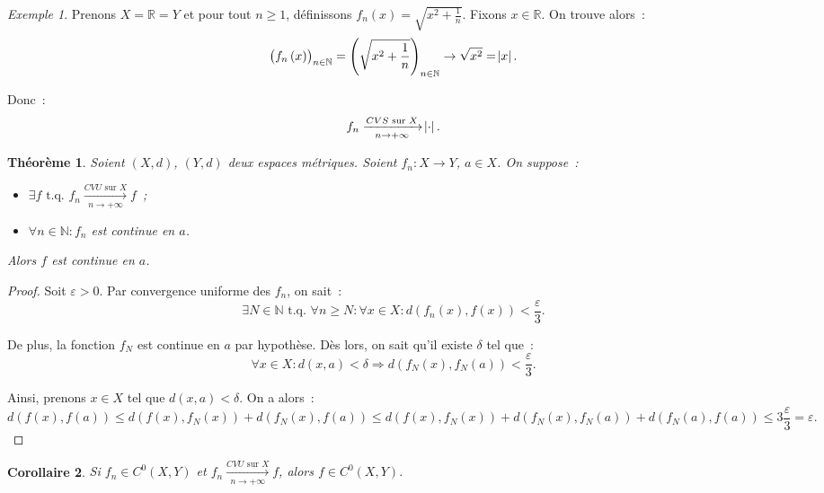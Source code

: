 \documentclass{report}
\newtheorem{thm}{Théorème}[chapter]
\newtheorem{cor}[thm]{Corollaire}
\theoremstyle{definition}
\theoremstyle{remark}
\newtheorem{ex}{Exemple}[chapter]
\numberwithin{equation}{section}
\newcommand{\R}{\mathbb R}
\newcommand{\N}{\mathbb N}
\newcommand{\tq}{\text{ t.q. }}
\newcommand{\seqf}[4]{\left(#1_{#2}\left(#3\right)\right)_{#2 \in #4}}
\newcommand{\CONV}[5]{\xrightarrow[#2 \to #3]{#4 \text{ #5 } #1}}
\newcommand{\CVS}[3]{\CONV{#1}{#2}{#3}{CVS}{sur}}
\newcommand{\CVU}[3]{\CONV{#1}{#2}{#3}{CVU}{sur}}
\newcommand{\pinfty}{{+\infty}}
\begin{document}
			\begin{ex} Prenons $X = \R = Y$ et pour tout $n \geq 1$, définissons $f_n(x) = \sqrt{x^2 + \frac 1n}$. Fixons $x \in \R$. On trouve alors~:
			\begin{equation}
				\seqf fnx\N = \left(\sqrt{x^2 + \frac 1n}\right)_{n \in \N} \to \sqrt {x^2} = \abs x.
			\end{equation}

			Donc~:
			\begin{equation}
				f_n \CVS Xn\pinfty \abs \cdot.
			\end{equation}
			\end{ex}

			\begin{thm} Soient $(X, d)$, $(Y, d)$ deux espaces métriques. Soient $f_n : X \to Y$, $a \in X$. On suppose~:
			\begin{itemize}
				\item $\exists f \tq f_n \CVU Xn\pinfty f$~;
				\item $\forall n \in \N : f_n$ est continue en $a$.
			\end{itemize}

			Alors $f$ est continue en $a$.
			\end{thm}

			\begin{proof}  Soit $\varepsilon > 0$. Par convergence uniforme des $f_n$, on sait~:
			\begin{equation}
				\exists N \in \N \tq \forall n \geq N : \forall x \in X : d(f_n(x), f(x)) < \frac \varepsilon3.
			\end{equation}

			De plus, la fonction $f_N$ est continue en $a$ par hypothèse. Dès lors, on sait qu'il existe $\delta$ tel que~:
			\begin{equation}
				\forall x \in X : d(x, a) < \delta \Rightarrow d(f_N(x), f_N(a)) < \frac \varepsilon3.
			\end{equation}

			Ainsi, prenons $x \in X$ tel que $d(x, a) < \delta$. On a alors~:
			\begin{equation}
				d(f(x), f(a)) \leq d(f(x), f_N(x)) + d(f_N(x), f(a)) \leq d(f(x), f_N(x)) + d(f_N(x), f_N(a)) + d(f_N(a), f(a)) \leq 3\frac \varepsilon3 = \varepsilon.
			\end{equation}
			\end{proof}

			\begin{cor} Si $f_n \in C^0(X, Y)$ et $f_n \CVU Xn\pinfty f$, alors $f \in C^0(X, Y)$. \end{cor}
\end{document}
